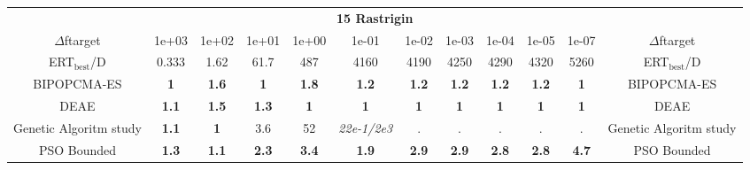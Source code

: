 \begin{tabular}{cccccccccccc}
 & \multicolumn{10}{c}{{\normalsize \textbf{15 Rastrigin}}}\\
$\Delta$ftarget& 1e+03& 1e+02& 1e+01& 1e+00& 1e-01& 1e-02& 1e-03& 1e-04& 1e-05& 1e-07 & $\Delta$ftarget \\
ERT$_{\textrm{best}}$/D& 0.333& 1.62& 61.7& 487& 4160& 4190& 4250& 4290& 4320& 5260 & ERT$_{\textrm{best}}$/D \\
\hline
BIPOPCMA-ES & \textbf{1} & \textbf{1.6} & \textbf{1} & \textbf{1.8} & \textbf{1.2} & \textbf{1.2} & \textbf{1.2} & \textbf{1.2} & \textbf{1.2} & \textbf{1} & BIPOPCMA-ES \cite{add_an_entry_for_BIPOPCMA-ES_in_bbob.bib}\\
DEAE & \textbf{1.1} & \textbf{1.5} & \textbf{1.3} & \textbf{1} & \textbf{1} & \textbf{1} & \textbf{1} & \textbf{1} & \textbf{1} & \textbf{1} & DEAE \cite{add_an_entry_for_DEAE_in_bbob.bib}\\
Genetic Algoritm study & \textbf{1.1} & \textbf{1} & 3.6 & 52 & \textit{22e-1}\textit{/2e3} & . & . & . & . & . & Genetic Algoritm study \cite{add_an_entry_for_Genetic Algoritm study_in_bbob.bib}\\
PSO Bounded & \textbf{1.3} & \textbf{1.1} & \textbf{2.3} & \textbf{3.4} & \textbf{1.9} & \textbf{2.9} & \textbf{2.9} & \textbf{2.8} & \textbf{2.8} & \textbf{4.7} & PSO Bounded \cite{add_an_entry_for_PSO Bounded_in_bbob.bib}
\end{tabular}
